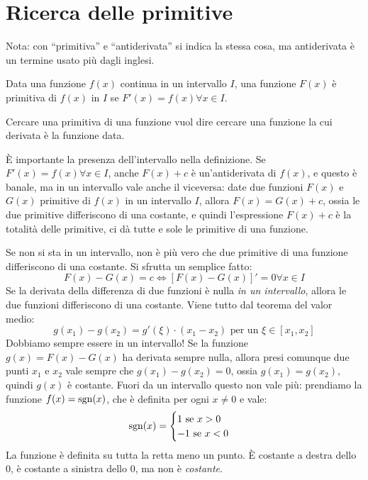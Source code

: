 \section{Ricerca delle primitive}

Nota: con ``primitiva'' e ``antiderivata'' si indica la stessa cosa, ma antiderivata \`e un termine usato pi\`u dagli inglesi.

\begin{defn}
Data una funzione $f(x)$ continua in un intervallo $I$, una funzione $F(x)$ \`e primitiva di $f(x)$ in $I$ se $F'(x) = f(x) \forall x \in I$.
\end{defn}
Cercare una primitiva di una funzione vuol dire cercare una funzione la cui derivata \`e la funzione data.

\`E importante la presenza dell'intervallo nella definizione. Se $F'(x) = f(x) \forall x \in I$, anche $F(x) + c$ \`e un'antiderivata di $f(x)$, e questo \`e banale, ma in un intervallo vale anche il viceversa: date due funzioni $F(x)$ e $G(x)$ primitive di $f(x)$ in un intervallo $I$, allora $F(x) = G(x) + c$, ossia le due primitive differiscono di una costante, e quindi l'espressione $F(x) + c$ \`e la totalit\`a delle primitive, ci d\`a tutte e sole le primitive di una funzione.

Se non si sta in un intervallo, non \`e pi\`u vero che due primitive di una funzione differiscono di una costante. Si sfrutta un semplice fatto:
\[
F(x) - G(x) = c \iff \left[ F(x) - G(x) \right]' = 0 \forall x \in I
\]
Se la derivata della differenza di due funzioni \`e nulla \emph{in un intervallo}, allora le due funzioni differiscono di una costante. Viene tutto dal teorema del valor medio:
\[
g(x_1) - g(x_2) = g'(\xi) \cdot (x_1 - x_2) \text{ per un } \xi \in [x_1, x_2]
\]
Dobbiamo sempre essere in un intervallo! Se la funzione $g(x) = F(x) - G(x)$ ha derivata sempre nulla, allora presi comunque due punti $x_1$ e $x_2$ vale sempre che $g(x_1) - g(x_2) = 0$, ossia $g(x_1) = g(x_2)$, quindi $g(x)$ \`e costante. Fuori da un intervallo questo non vale pi\`u: prendiamo la funzione $f(x) = \operatorname{sgn}(x)$, che \`e definita per ogni $x \neq 0$ e vale:
\[
\operatorname{sgn}(x) = 
\begin{cases}
1 \text{ se } x > 0 \\
-1 \text{ se } x < 0
\end{cases}
\]
La funzione \`e definita su tutta la retta meno un punto. \`E costante a destra dello 0, \`e costante a sinistra dello 0, ma non \`e \emph{costante}.

